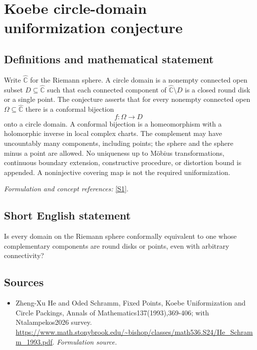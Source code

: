 \documentclass[11pt]{article}
\begin{document}
\section*{\texorpdfstring{Koebe circle-domain uniformization conjecture}{Koebe circle-domain uniformization conjecture}}\label{30006872}
\subsection{Definitions and mathematical statement}
Write $\widehat{{\mathbb{C}}}$ for the Riemann sphere. A circle domain is a nonempty connected open subset $D\subseteq\widehat{{\mathbb{C}}}$ such that each connected component of $\widehat{{\mathbb{C}}}\setminus D$ is a closed round disk or a single point. The conjecture asserts that for every nonempty connected open $\Omega\subseteq\widehat{{\mathbb{C}}}$ there is a conformal bijection
\[
 f:\Omega\longrightarrow D
\]
onto a circle domain. A conformal bijection is a homeomorphism with a holomorphic inverse in local complex charts. The complement may have uncountably many components, including points; the sphere and the sphere minus a point are allowed. No uniqueness up to M\"obius transformations, continuous boundary extension, constructive procedure, or distortion bound is appended. A noninjective covering map is not the required uniformization.
\par\smallskip\textit{Formulation and concept references:} \href{https://www.math.stonybrook.edu/~bishop/classes/math536.S24/He_Schramm_1993.pdf}{[S1]}.

\subsection{Short English statement}
Is every domain on the Riemann sphere conformally equivalent to one whose complementary components are round disks or points, even with arbitrary connectivity?
\subsection{Sources}
\begin{itemize}
\item[S1]Zheng-Xu He and Oded Schramm, Fixed Points, Koebe Uniformization and Circle Packings, Annals of Mathematics137(1993),369-406; with Ntalampekos2026 survey.
\url{https://www.math.stonybrook.edu/~bishop/classes/math536.S24/He_Schramm_1993.pdf}.
\textit{Formulation source.}
\end{itemize}
\end{document}
